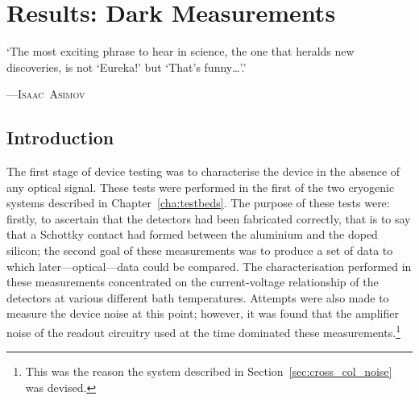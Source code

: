 \chapter{Results: Dark Measurements}
\label{cha:darkResults}
\epigraph{`The most exciting phrase to hear in science, the one that heralds new discoveries, is not `Eureka!' but `That's funny\ldots'.'}{\mbox{\textup{---\textsc{Isaac Asimov}}}}
%
\section{Introduction}\label{sec:darkresults_introduction}
The first stage of device testing was to characterise the device in the absence of any optical signal. These tests were performed in the first of the two cryogenic systems described in Chapter~\ref{cha:testbeds}. The purpose of these tests were: firstly, to ascertain that the detectors had been fabricated correctly, that is to say that a Schottky contact had formed between the aluminium and the doped silicon; the second goal of these measurements was to produce a set of data to which later---optical---data could be compared. The characterisation performed in these measurements concentrated on the current-voltage relationship of the detectors at various different bath temperatures. Attempts were also made to measure the device noise at this point; however, it was found that the amplifier noise of the readout circuitry used at the time dominated these measurements.\footnote{This was the reason the system described in Section~\ref{sec:cross_col_noise} was devised.}
%
